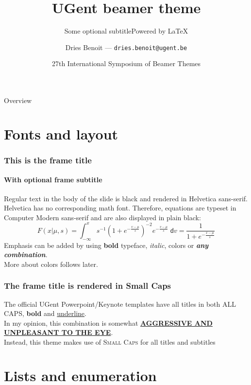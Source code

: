 \documentclass[aspectratio=169]{beamer}
\title{UGent beamer theme}
\subtitle{Some optional subtitle}
\subtitle{Powered by \LaTeX}
\date[ISBT 2018]{27th International Symposium of Beamer Themes}
\author[DB]{Dries Benoit --- \texttt{dries.benoit@ugent.be}}
\begin{document}
\logoframe

\titleframe

\begin{frame}{Overview}
    \tableofcontents[hideallsubsections]
\end{frame}

\section{Fonts and layout}

\begin{frame}
    \frametitle{This is the frame title}
    \framesubtitle{With optional frame subtitle}
    Regular text in the body of the slide is black and rendered in Helvetica sans-serif.\\[.5cm]
    Helvetica has no corresponding math font.
    Therefore, equations are typeset in Computer Modern sans-serif and are also displayed in plain black:
    \begin{equation*}
        F(x|\mu,s) = \int_{-\infty}^x s^{-1}\left(1+e^{-\frac{v-\mu}{s}}\right)^{-2} e^{-\frac{v-\mu}{s}}\;\mathsf{d}v = \frac{1}{1+e^{-\frac{x-\mu}{s}}}
    \end{equation*}
    Emphasis can be added by using \textbf{bold} typeface, \textit{italic}, {\color{ugent-alert}colors} or {\color{ugent-alert}\textbf{\textit{any combination}}}.\\
    More about colors follows later.
\end{frame}

\begin{frame}
    \frametitle{The frame title is rendered in Small Caps}
    The official UGent Powerpoint/Keynote templates have all titles in both ALL CAPS, \textbf{bold} and \underline{underline}.\\[.5cm]
    In my opinion, this combination is somewhat \underline{\textbf{AGGRESSIVE AND UNPLEASANT TO THE EYE}}.\\[.5cm]
    Instead, this theme makes use of \textsc{Small Caps} for all titles and subtitles
\end{frame}


\section{Lists and enumeration}
\end{document}

